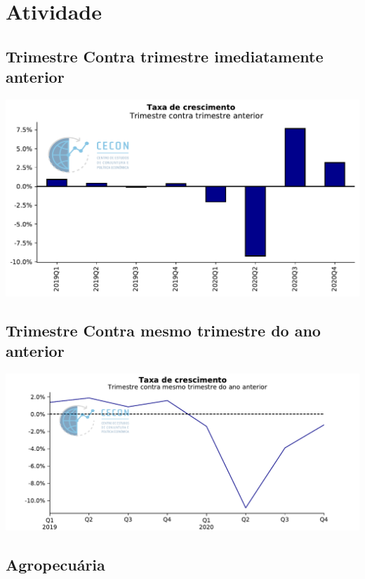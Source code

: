 \documentclass{SelfArx}
\begin{document}
\section*{Atividade}
\label{sec:orgefb06dc}



\subsection*{Trimestre Contra trimestre imediatamente anterior}
\label{sec:org664c8b1}

\begin{center}
\includegraphics[width=.9\linewidth]{./figs/PIB/PIB.pdf}
\end{center}

\subsection*{Trimestre Contra mesmo trimestre do ano anterior}
\label{sec:org704e767}

\begin{center}
\includegraphics[width=.9\linewidth]{./figs/PIB/PIB_YoY.pdf}
\end{center}

\subsection*{Agropecuária}
\label{sec:orgc914f7f}
\end{document}
